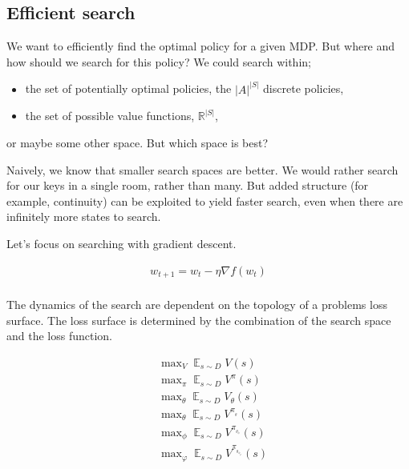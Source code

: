 \subsection{Efficient search}

We want to efficiently find the optimal policy for a given MDP. But where and how should we
search for this policy? We could search within;

\begin{itemize}
\tightlist
\item
the set of potentially optimal policies, the \(|A|^{|S|}\) discrete policies,
\item
the set of possible value functions, \(\mathbb R^{|S|}\),
\end{itemize}
or maybe some other space. But which space is best?

Naively, we know that smaller search spaces are better. We would rather
search for our keys in a single room, rather than many. But added
structure (for example, continuity) can be exploited to yield faster
search, even when there are infinitely more states to search.


Let's focus on searching with gradient descent.

\begin{align}
w_{t+1} = w_t - \eta \nabla f(w_t) \\
\end{align}

The dynamics of the search are dependent on the topology of a problems loss surface.
The loss surface is determined by the combination of the search space and the loss function.

\begin{align}
&\mathop{\text{max}}_V \mathop{\mathbb E}_{s\sim D} V(s) \\
&\mathop{\text{max}}_{\pi} \mathop{\mathbb E}_{s\sim D}V^{\pi}(s) \\
&\mathop{\text{max}}_{\theta} \mathop{\mathbb E}_{s\sim D} V_{\theta}(s) \\
&\mathop{\text{max}}_{\theta} \mathop{\mathbb E}_{s\sim D} V^{\pi_{_{\theta}}}(s) \\
&\mathop{\text{max}}_{\phi} \mathop{\mathbb E}_{s\sim D} V^{\pi_{_{\theta_{\phi}}}}(s) \\
&\mathop{\text{max}}_{\varphi} \mathop{\mathbb E}_{s\sim D} V^{\pi_{_{\theta_{\phi_{\varphi}}}}}(s)
\end{align}

